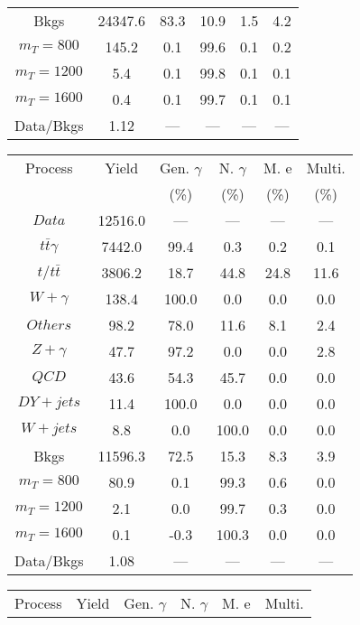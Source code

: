 \begin{figure}
\begin{minipage}[c]{0.32\textwidth}
{\begin{tabular}{cccccc}
Bkgs &  24347.6 &  83.3 &  10.9 &  1.5 &  4.2\\
$ m_{T} = 800 $ &  145.2 &  0.1 &  99.6 &  0.1 &  0.2\\
$ m_{T} = 1200 $ &  5.4 &  0.1 &  99.8 &  0.1 &  0.1\\
$ m_{T} = 1600 $ &  0.4 &  0.1 &  99.7 &  0.1 &  0.1\\
Data/Bkgs &  1.12 &  --- &  --- &  --- &  ---\\
\hline
\end{tabular}
}
\end{minipage}
\begin{minipage}[c]{0.32\textwidth}
\centering
\tiny{
\begin{tabular}{cccccc}
\hline
Process & Yield & Gen. $\gamma$ & N. $\gamma$ & M. e & Multi. \\
 &  & (\%) & (\%) & (\%) & (\%)  \\
\hline
                                                                      $ Data $ &  12516.0 &  --- &  --- &  --- &  ---\\
$ t\bar{t}\gamma $ &  7442.0 &  99.4 &  0.3 &  0.2 &  0.1\\
$ t/t\bar{t} $ &  3806.2 &  18.7 &  44.8 &  24.8 &  11.6\\
$ W+\gamma $ &  138.4 &  100.0 &  0.0 &  0.0 &  0.0\\
$ Others $ &  98.2 &  78.0 &  11.6 &  8.1 &  2.4\\
$ Z+\gamma $ &  47.7 &  97.2 &  0.0 &  0.0 &  2.8\\
$ QCD $ &  43.6 &  54.3 &  45.7 &  0.0 &  0.0\\
$ DY+jets $ &  11.4 &  100.0 &  0.0 &  0.0 &  0.0\\
$ W+jets $ &  8.8 &  0.0 &  100.0 &  0.0 &  0.0\\
Bkgs &  11596.3 &  72.5 &  15.3 &  8.3 &  3.9\\
$ m_{T} = 800 $ &  80.9 &  0.1 &  99.3 &  0.6 &  0.0\\
$ m_{T} = 1200 $ &  2.1 &  0.0 &  99.7 &  0.3 &  0.0\\
$ m_{T} = 1600 $ &  0.1 &  -0.3 &  100.3 &  0.0 &  0.0\\
Data/Bkgs &  1.08 &  --- &  --- &  --- &  ---\\
\hline
\end{tabular}
}
\end{minipage}
\begin{minipage}[c]{0.32\textwidth}
\centering
\tiny{
\begin{tabular}{cccccc}
\hline
Process & Yield & Gen. $\gamma$ & N. $\gamma$ & M. e & Multi. \\

\end{tabular}}
\end{minipage}
\end{figure}
